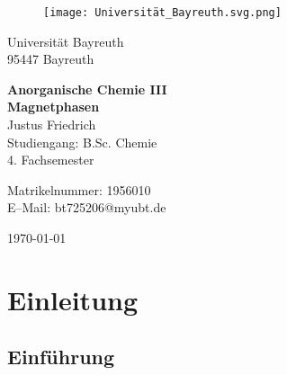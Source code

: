 \documentclass[12pt, a4paper]{article}
\begin{document}
\begin{figure}
    \texttt{[image: Universität\_Bayreuth.svg.png]}
\end{figure}



{\raggedright Universität Bayreuth\\  95447 Bayreuth}


\vspace{5cm}

\begin{center}
{\LARGE\bf{Anorganische Chemie III}} \\  
\vspace{1cm}
{\Large\bf{Magnetphasen}}\\
\vspace{0.5cm}
{\large Justus Friedrich\\}
{Studiengang: B.Sc. Chemie\\}
{4. Fachsemester}
\end{center}





\thispagestyle{empty}
\begin{center}
{\small Matrikelnummer: 1956010 \\
E–Mail:  bt725206@myubt.de}
\end{center}

\vspace{5cm}

\today


\newpage
\tableofcontents
\thispagestyle{empty}


\newpage
\setcounter{page}{1}
\section{Einleitung}



\subsection{Einführung}
\end{document}
